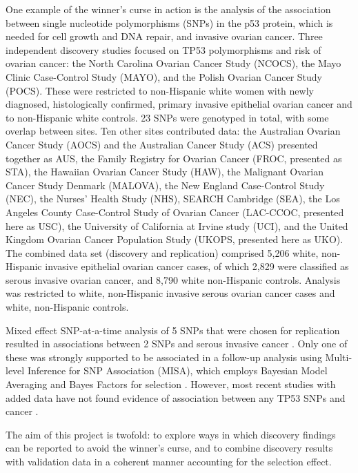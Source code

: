 \documentclass[AMA,STIX1COL]{WileyNJD-v2}\usepackage[]{graphicx}\usepackage[]{color}
\begin{document}
One example of the winner's curse in action is the analysis of the association between single nucleotide polymorphisms (SNPs) in the p53 protein, which is needed for cell growth and DNA repair, and invasive ovarian cancer. Three independent discovery studies focused on TP53 polymorphisms and risk of ovarian cancer: the North Carolina Ovarian Cancer Study (NCOCS), the Mayo Clinic Case-Control Study (MAYO), and the Polish Ovarian Cancer Study (POCS). These were restricted to non-Hispanic white women with newly diagnosed, histologically confirmed, primary invasive epithelial ovarian cancer and to non-Hispanic white controls. 23 SNPs were genotyped in total, with some overlap between sites. Ten other sites contributed data: the Australian Ovarian Cancer Study (AOCS) and the Australian Cancer Study (ACS) presented together as AUS, the Family Registry for Ovarian Cancer (FROC, presented as STA), the Hawaiian Ovarian Cancer Study (HAW), the Malignant Ovarian Cancer Study Denmark (MALOVA), the New England Case-Control Study (NEC), the Nurses' Health Study (NHS), SEARCH Cambridge (SEA), the Los Angeles County Case-Control Study of Ovarian Cancer (LAC-CCOC, presented here as USC), the University of California at Irvine study (UCI), and the United Kingdom Ovarian Cancer Population Study (UKOPS, presented here as UKO). The combined data set (discovery and replication) comprised 5,206 white, non-Hispanic invasive epithelial ovarian cancer cases, of which 2,829 were classified as serous invasive ovarian cancer, and 8,790 white non-Hispanic controls. Analysis was restricted to white, non-Hispanic invasive serous ovarian cancer cases and white, non-Hispanic controls.

Mixed effect SNP-at-a-time analysis of 5 SNPs that were chosen for replication resulted in associations between 2 SNPs and serous invasive cancer \cite{Schildkraut2349}. Only one of these was strongly supported to be associated in a follow-up analysis using Multi-level Inference for SNP Association (MISA), which employs Bayesian Model Averaging and Bayes Factors for selection \cite{schildkraut2010association}. However, most recent studies with added data have not found evidence of association between any TP53 SNPs and cancer \cite{phelan2017identification}.

The aim of this project is twofold: to explore ways in which discovery findings can be reported to avoid the winner's curse, and to combine discovery results with validation data in a coherent manner accounting for the selection effect. 
\end{document}
